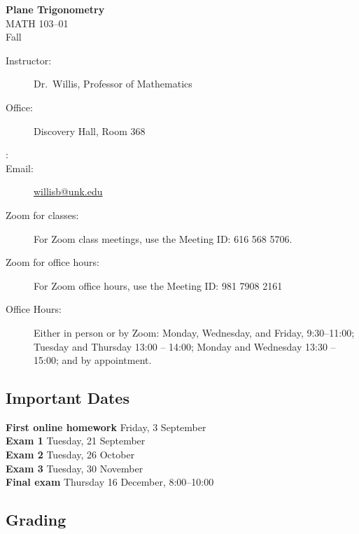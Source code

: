 \documentclass[12pt]{article}
\newcounter{ex}\setcounter{ex}{0}
\newenvironment{mypar}[2]
  {\begin{list}{}%
    {\setlength\leftmargin{#1}
    \setlength\rightmargin{#2}}
    \item[]}
  {\end{list}}
\newcommand{\term}{Fall }
\newcommand{\coursename}{Plane Trigonometry}
\newcommand{\coursenumber}{MATH 103}
\newcommand{\sectionnumber}{01}
\begin{document}
\large
\begin{center}
    \textbf{\coursename}  \\
    {\coursenumber--\sectionnumber} \\
     {\term \the\year} \\
\end{center}

\vskip0.25in
\normalsize


\begin{center}
\begin{description}
    \item[Instructor:] Dr.\  Willis, Professor of Mathematics
    \item[Office:]  Discovery Hall, Room 368
    \item[\phone:]  
    \item[Email:] \href{mailto:willisb@unk.edu}{willisb@unk.edu}
    \item[Zoom for classes:] For Zoom class meetings, use the Meeting ID: 616 568 5706. 
    \item[Zoom for office hours:] For Zoom office hours, use the Meeting ID: 981 7908 2161 
    \item[Office Hours:] Either in person or by Zoom: Monday, Wednesday, and  Friday, \mbox{9:30--11:00}; Tuesday and Thursday 13:00 -- 14:00; Monday and Wednesday 13:30 -- 15:00;  and by appointment.
  \end{description}
\end{center}


\subsection*{Important Dates}

\begin{mypar}{0.25in}{0.25in}
    \textbf{First online homework} \dotfill Friday, 3 September \\
    \textbf{Exam 1} \dotfill Tuesday, 21 September \\
    \textbf{Exam 2} \dotfill Tuesday, 26 October \\
    \textbf{Exam 3} \dotfill Tuesday, 30 November \\
     \textbf{Final exam} \dotfill Thursday 16 December, 8:00--10:00\\
\end{mypar}

\subsection*{Grading}
\end{document}
